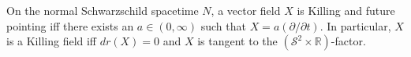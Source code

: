 On the normal Schwarzschild spacetime $N$, a vector field $X$ is Killing and future pointing iff there exists an $a \in (0, \infty)$ such that $X = a(\partial/\partial t)$. In particular, $X$ is a Killing field iff $dr(X) = 0$ and $X$ is tangent to the $(\mathcal{S}^2 \times \mathbb{R})$-factor.
